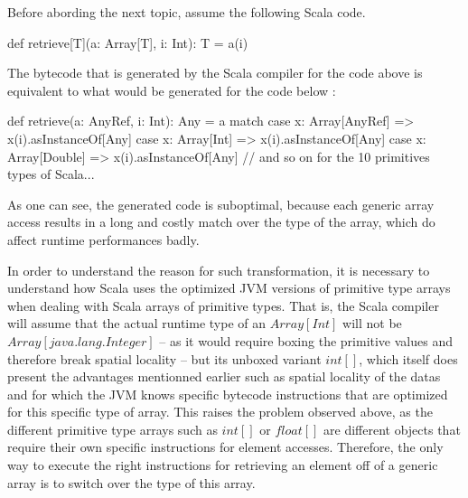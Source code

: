 
Before abording the next topic, assume the following Scala code.

\begin{lstlisting-nobreak}
  def retrieve[T](a: Array[T], i: Int): T = {
    a(i)
  }
\end{lstlisting-nobreak}

The bytecode that is generated by the Scala compiler for the code above is equivalent to what would be generated for the code below : 

\begin{lstlisting-nobreak}
  def retrieve(a: AnyRef, i: Int): Any = {
    a match {
      case x: Array[AnyRef] => x(i).asInstanceOf[Any]
      case x: Array[Int] => x(i).asInstanceOf[Any]
      case x: Array[Double] => x(i).asInstanceOf[Any]
      // and so on for the 10 primitives types of Scala...
    }
  }
\end{lstlisting-nobreak}

As one can see, the generated code is suboptimal, because each generic array access results in a long and costly match over the type of the array, which do affect runtime performances badly.  


In order to understand the reason for such transformation, it is necessary to understand how Scala uses the optimized JVM versions of primitive type arrays when dealing with Scala arrays of primitive types. That is, the Scala compiler will assume that the actual runtime type of an $Array[Int]$ will not be $Array[java.lang.Integer]$ -- as it would require boxing the primitive values and therefore break spatial locality -- but its unboxed variant $int[]$, which itself does present the advantages mentionned earlier such as spatial locality of the datas and for which the JVM knows specific bytecode instructions that are optimized for this specific type of array. This raises the problem observed above, as the different primitive type arrays such as $int[]$ or $float[]$ are different objects that require their own specific instructions for element accesses. Therefore, the only way to execute the right instructions for retrieving an element off of a generic array is to switch over the type of this array.

